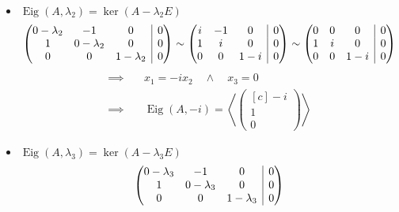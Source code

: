 \documentclass[answers]{exam}
\makeatletter
\newenvironment{sysmatrix}[1]
  {\left(\begin{array}{@{}#1@{}}}
  {\end{array}\right)}
\newcommand{\scalarprod}[1]{\left\langle #1 \right\rangle}
\newcommand{\vektor}[1]{\begin{pmatrix*}[c] #1 \end{pmatrix*}}
\newcommand{\Eig}{\operatorname{Eig}}
\makeatother
\begin{document}
\begin{questions}
\begin{parts}
\begin{solution}
\begin{itemize}
$$\begin{aligned}
                          \end{aligned}
                      $$
                \item $\Eig(A, \lambda_2) = \ker(A-\lambda_2 E)$
                      $$
                          \begin{sysmatrix}{ccc|c}
                              0 -\lambda_2 & -1 & 0 & 0 \\
                              1 & 0 -\lambda_2  & 0 & 0 \\
                              0 & 0 & 1 -\lambda_2  & 0
                          \end{sysmatrix}
                          \sim
                          \begin{sysmatrix}{ccc|c}
                              i & -1 & 0 & 0 \\
                              1 & i  & 0 & 0 \\
                              0 & 0 & 1-i  & 0
                          \end{sysmatrix}
                          \sim
                          \begin{sysmatrix}{ccc|c}
                              0 & 0 & 0 & 0 \\
                              1 & i  & 0 & 0 \\
                              0 & 0 & 1-i  & 0
                          \end{sysmatrix}
                      $$
                      $$
                          \begin{aligned}
                              \implies & \quad x_1 = -ix_2 \quad \land \quad x_3 = 0 \\
                              \implies & \quad \Eig(A, -i) = \scalarprod{\vektor{-i  \\1\\0}}
                          \end{aligned}
                      $$
                \item $\Eig(A, \lambda_3) = \ker(A-\lambda_3 E)$
                      $$
                          \begin{sysmatrix}{ccc|c}
                              0 -\lambda_3 & -1 & 0 & 0 \\
                              1 & 0 -\lambda_3  & 0 & 0 \\
                              0 & 0 & 1 -\lambda_3  & 0
                          \end{sysmatrix}
$$
\end{itemize}
\end{solution}
\end{parts}
\end{questions}
\end{document}
